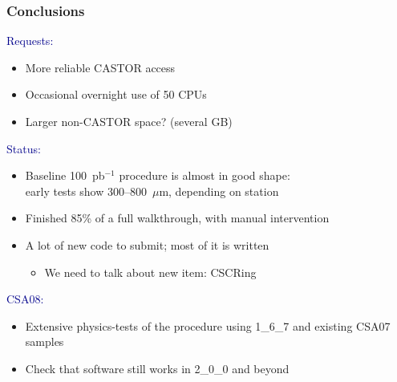 \documentclass[compress]{beamer}
\begin{document}
\begin{frame}
\frametitle{Conclusions}
\textcolor{darkblue}{Requests:}
\begin{itemize}
\item More reliable CASTOR access
\item Occasional overnight use of 50 CPUs
\item Larger non-CASTOR space?  (several GB)
\end{itemize}

\vfill
\textcolor{darkblue}{Status:}
\begin{itemize}
\item Baseline 100~pb$^{-1}$ procedure is almost in good shape: \\ early
tests show 300--800~$\mu$m, depending on station
\item Finished 85\% of a full walkthrough, with manual intervention
\item A lot of new code to submit; most of it is written
\begin{itemize}
\item We need to talk about new item: CSCRing
\end{itemize}
\end{itemize}

\vfill
\textcolor{darkblue}{CSA08:}
\begin{itemize}
\item Extensive physics-tests of the procedure using 1\_6\_7 and existing CSA07 samples
\item Check that software still works in 2\_0\_0 and beyond
\end{itemize}

\label{numpages}
\end{frame}
\end{document}
